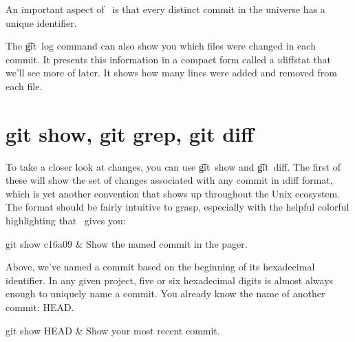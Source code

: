 \documentclass[letterpaper,12pt,titlepage,twoside]{article}
\begin{document}


An important aspect of \git\ is that every distinct commit in the universe has
a unique identifier.


The \t{git~log} command can also show you which files were changed in each
commit. It presents this information in a compact form called a \i{diffstat}
that we'll see more of later. It shows how many lines were added and removed
from each file.




\section{git show, git grep, git diff}

To take a closer look at changes, you can use \t{git~show} and \t{git~diff}.
The first of these will show the set of changes associated with any commit in
\i{diff format}, which is yet another convention that shows up throughout the
Unix ecosystem. The format should be fairly intuitive to grasp, especially
with the helpful colorful highlighting that \git\ gives you:

\begin{typeme}
git show c16a09 & Show the named commit in the pager.
\end{typeme}

Above, we've named a commit based on the beginning of its hexadecimal
identifier. In any given project, five or six hexadecimal digits is almost
always enough to uniquely name a commit. You already know the name of another
commit: HEAD.

\begin{typeme}
git show HEAD & Show your most recent commit.
\end{typeme}
\end{document}
